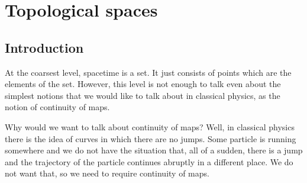 %

\chapter{Topological spaces}

\section{Introduction}
At the coarsest level, spacetime is a set. It just consists of points which are
the elements of the set. However, this level is not enough to talk even about
the simplest notions that we would like to talk about in classical physics, as
the notion of continuity of maps.

Why would we want to talk about continuity of maps? Well, in classical physics
there is the idea of curves in which there are no jumps. Some particle is
running somewhere and we do not have the situation that, all of a sudden, there
is a jump and the trajectory of the particle continues abruptly in a different
place. We do not want that, so we need to require continuity of maps.

